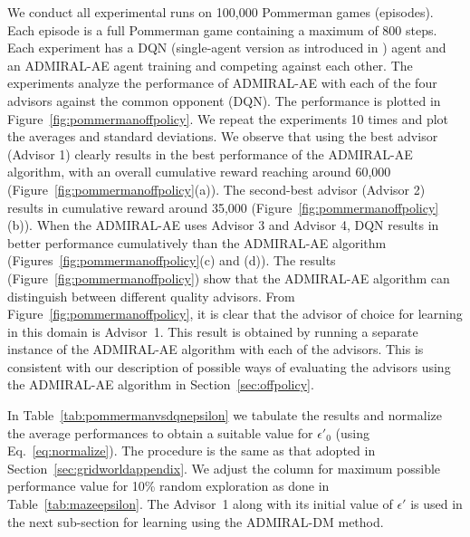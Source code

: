 \documentclass[jair, twoside,11pt,theapa]{article}
\begin{document}
We conduct all experimental runs on 100,000 Pommerman games (episodes). Each episode is a full Pommerman game containing a maximum of 800 steps. Each experiment has a DQN (single-agent version as introduced in \citet{mnih2015human}) agent and an ADMIRAL-AE agent training and competing against each other. The experiments analyze the performance of ADMIRAL-AE with each of the four advisors against the common opponent (DQN). The performance is plotted in Figure~\ref{fig:pommermanoffpolicy}. We repeat the experiments 10 times and plot the averages and standard deviations. We observe that using the best advisor (Advisor 1) clearly results in the best performance of the ADMIRAL-AE algorithm, with an   overall cumulative reward reaching around 60,000 (Figure~\ref{fig:pommermanoffpolicy}(a)). The second-best advisor (Advisor 2) results in cumulative reward around 35,000 (Figure~\ref{fig:pommermanoffpolicy}(b)). When the ADMIRAL-AE uses Advisor 3 and Advisor 4, DQN results in  better performance cumulatively than the ADMIRAL-AE algorithm (Figures~\ref{fig:pommermanoffpolicy}(c) and (d)). 
The results (Figure~\ref{fig:pommermanoffpolicy}) show that the ADMIRAL-AE algorithm can distinguish between different quality advisors. From Figure~\ref{fig:pommermanoffpolicy}, it is clear that the advisor of choice for learning in this domain is Advisor~1. This result is obtained by running a separate instance of the ADMIRAL-AE algorithm with each of the advisors. This is consistent with our description of possible ways of evaluating the advisors using the ADMIRAL-AE algorithm in Section~\ref{sec:offpolicy}. 

In Table~\ref{tab:pommermanvsdqnepsilon} we tabulate the results and normalize the average performances to obtain a suitable value for $\epsilon'_0$ (using Eq.~\ref{eq:normalize}). The procedure is the same as that adopted in Section~\ref{sec:gridworldappendix}. We adjust the column for maximum possible performance value for 10\% random exploration as done in Table~\ref{tab:mazeepsilon}. The Advisor~1 along with its initial value of $\epsilon'$ is used in the next sub-section for learning using the ADMIRAL-DM method. 
\end{document}
